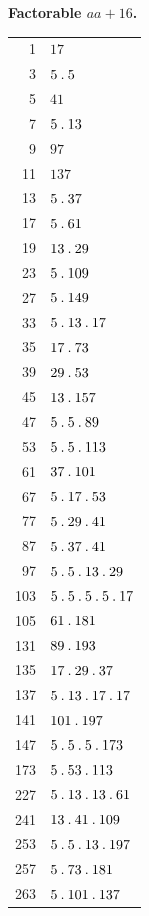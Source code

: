 \par{}
\begin{center}\textbf{Factorable $aa+16$.}\end{center}
\begingroup\small\setlength{\tabcolsep}{5pt}
\begin{longtable}{@{}r|l@{}}
1 & $17$\\
3 & $5\mathbin{.} 5$\\
5 & $41$\\
7 & $5\mathbin{.} 13$\\
9 & $97$\\
11 & $137$\\
13 & $5\mathbin{.} 37$\\
17 & $5\mathbin{.} 61$\\
19 & $13\mathbin{.} 29$\\
23 & $5\mathbin{.} 109$\\
27 & $5\mathbin{.} 149$\\
33 & $5\mathbin{.} 13\mathbin{.} 17$\\
35 & $17\mathbin{.} 73$\\
39 & $29\mathbin{.} 53$\\
45 & $13\mathbin{.} 157$\\
47 & $5\mathbin{.} 5\mathbin{.} 89$\\
53 & $5\mathbin{.} 5\mathbin{.} 113$\\
61 & $37\mathbin{.} 101$\\
67 & $5\mathbin{.} 17\mathbin{.} 53$\\
77 & $5\mathbin{.} 29\mathbin{.} 41$\\
87 & $5\mathbin{.} 37\mathbin{.} 41$\\
97 & $5\mathbin{.} 5\mathbin{.} 13\mathbin{.} 29$\\
103 & $5\mathbin{.} 5\mathbin{.} 5\mathbin{.} 5\mathbin{.} 17$\\
105 & $61\mathbin{.} 181$\\
131 & $89\mathbin{.} 193$\\
135 & $17\mathbin{.} 29\mathbin{.} 37$\\
137 & $5\mathbin{.} 13\mathbin{.} 17\mathbin{.} 17$\\
141 & $101\mathbin{.} 197$\\
147 & $5\mathbin{.} 5\mathbin{.} 5\mathbin{.} 173$\\
173 & $5\mathbin{.} 53\mathbin{.} 113$\\
227 & $5\mathbin{.} 13\mathbin{.} 13\mathbin{.} 61$\\
241 & $13\mathbin{.} 41\mathbin{.} 109$\\
253 & $5\mathbin{.} 5\mathbin{.} 13\mathbin{.} 197$\\
257 & $5\mathbin{.} 73\mathbin{.} 181$\\
263 & $5\mathbin{.} 101\mathbin{.} 137$\\

\end{longtable}
